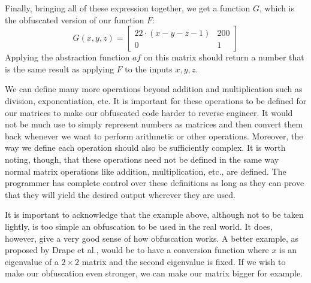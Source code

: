 Finally, bringing all of these expression together, we get a function $ G $,
which is the obfuscated version of our function $ F $:
\begin{equation*}
    G(x, y, z) =
    \begin{bmatrix}
        22 \cdot (x - y -z - 1) & 200 \\
        0 & 1
    \end{bmatrix}
\end{equation*}
Applying the abstraction function $ af $ on this matrix should return a number
that is
the same result as applying $ F $ to the inputs $ x, y, z $.

We can define many more operations beyond addition and multiplication such as
division, exponentiation, etc. It is important for
these operations to be defined for our matrices to make our obfuscated code
harder to reverse engineer. It would not be much use to simply represent
numbers as
matrices and then convert them back whenever we want to perform arithmetic or
other operations. Moreover, the way we define each operation should also be
sufficiently complex. It is worth noting, though, that these operations need
not be defined in the same way normal matrix operations like addition,
multiplication, etc., are defined. The programmer has complete control over
these definitions as long as they can prove that they will yield the desired
output wherever they are used.

It is important to acknowledge that the example above, although not to be taken
lightly, is too simple an
obfuscation to be used in the real world. It does, however, give a very good
sense of how
obfuscation works. A better example, as proposed by Drape et al., would be to
have a conversion function where $ x $ is an eigenvalue of a $ 2 \times 2 $
matrix and the second eigenvalue is fixed. If we wish to make our obfuscation
even stronger, we can make our matrix bigger for example.



